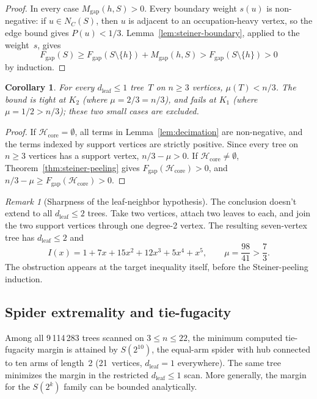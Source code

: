 \documentclass[12pt,oneside]{article}
\newtheorem{corollary}[theorem]{Corollary}
\theoremstyle{remark}
\newtheorem{remark}[theorem]{Remark}
\newcommand{\dleaf}{d_{\mathrm{leaf}}}    %
\begin{document}
\begin{proof}
In every case $M_{\mathrm{gap}}(h, S) > 0$.
Every boundary weight $s(u)$ is non-negative: if $u\in N_C(S)$, then $u$ is adjacent to an occupation-heavy vertex, so the edge bound gives $P(u)<1/3$.
Lemma~\ref{lem:steiner-boundary}, applied to the weight~$s$, gives
\[
  F_{\mathrm{gap}}(S) \ge F_{\mathrm{gap}}(S \setminus \{h\}) + M_{\mathrm{gap}}(h, S) > F_{\mathrm{gap}}(S \setminus \{h\}) > 0
\]
by induction.
\end{proof}

\begin{corollary}\label{cor:mu-bound}
For every $\dleaf \le 1$ tree~$T$ on $n \ge 3$ vertices, $\mu(T) < n/3$.
The bound is tight at $K_2$ (where $\mu = 2/3 = n/3$), and fails at $K_1$ (where $\mu = 1/2 > n/3$); these two small cases are excluded.
\end{corollary}

\begin{proof}
If $\mathcal H_{\mathrm{core}} = \emptyset$, all terms in Lemma~\ref{lem:decimation} are non-negative, and the terms indexed by support vertices are strictly positive. Since every tree on $n\ge3$ vertices has a support vertex, $n/3 - \mu > 0$.
If $\mathcal H_{\mathrm{core}} \ne \emptyset$, Theorem~\ref{thm:steiner-peeling} gives $F_{\mathrm{gap}}(\mathcal H_{\mathrm{core}}) > 0$, and $n/3 - \mu \ge F_{\mathrm{gap}}(\mathcal H_{\mathrm{core}}) > 0$.
\end{proof}

\begin{remark}[Sharpness of the leaf-neighbor hypothesis]
The conclusion doesn't extend to all $\dleaf\le2$ trees.
Take two vertices, attach two leaves to each, and join the two support vertices through one degree-2 vertex.
The resulting seven-vertex tree has $\dleaf\le2$ and
\[
  I(x)=1+7x+15x^2+12x^3+5x^4+x^5,
  \qquad
  \mu=\frac{98}{41}>\frac73.
\]
The obstruction appears at the target inequality itself, before the Steiner-peeling induction.
\end{remark}



\subsection{Spider extremality and tie-fugacity}\label{subsec:spider}

Among all 9\,114\,283 trees scanned on $3\le n\le22$, the minimum computed tie-fugacity margin is attained by $S(2^{10})$, the equal-arm spider with hub connected to ten arms of length~2 (21~vertices, $\dleaf = 1$ everywhere).
The same tree minimizes the margin in the restricted $\dleaf \le 1$ scan.
More generally, the margin for the $S(2^k)$ family can be bounded analytically.
\end{document}
